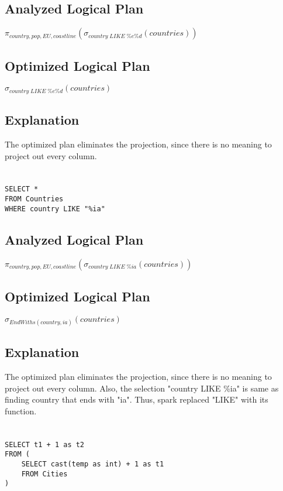 \documentclass[12pt]{article}
\begin{document}
\subsection*{Analyzed Logical Plan}
$\pi_{country, pop, EU, coastline}(\sigma_{country \; LIKE \; \%e\%d}(countries))$

\subsection*{Optimized Logical Plan}
$\sigma_{country \; LIKE \; \%e\%d}(countries)$

\subsection*{Explanation}
The optimized plan eliminates the projection, since there is no meaning to project out every column.

\newpage

\section{}
\begin{verbatim}
SELECT *
FROM Countries
WHERE country LIKE "%ia"
\end{verbatim}

\subsection*{Analyzed Logical Plan}
$\pi_{country, pop, EU, coastline}(\sigma_{country \; LIKE \; \%ia}(countries))$

\subsection*{Optimized Logical Plan}
$\sigma_{EndWiths(country, ia)}(countries)$

\subsection*{Explanation}
The optimized plan eliminates the projection, since there is no meaning to project out every column. Also, the selection "country LIKE \%ia" is same as finding country that ends with "ia". Thus, spark replaced "LIKE" with its function.

\newpage

\section{}
\begin{verbatim}
SELECT t1 + 1 as t2
FROM (
    SELECT cast(temp as int) + 1 as t1
    FROM Cities
)
\end{verbatim}
\end{document}
